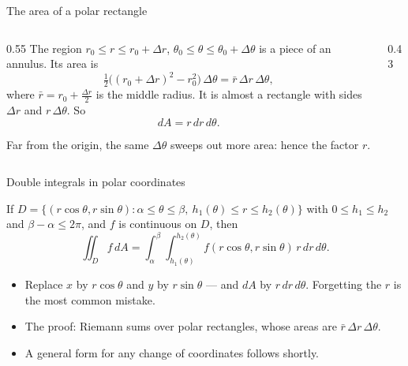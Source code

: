 \documentclass[10pt]{wosm-slides}
\newcommand{\dA}{\, dA}
\begin{document}
\begin{frame}{The area of a polar rectangle}
  \begin{columns}[c]
    \begin{column}{0.55\textwidth}
      The region $r_0 \le r \le r_0 + \Delta r$, $\theta_0 \le \theta \le \theta_0 + \Delta\theta$ is a piece of
      an annulus. Its area is
      \[ \tfrac12 \bigl((r_0 + \Delta r)^2 - r_0^2\bigr)\, \Delta\theta = \bar r\, \Delta r\, \Delta\theta , \]
      where $\bar r = r_0 + \frac{\Delta r}{2}$ is the middle radius.
      \pause
      It is almost a rectangle with sides $\Delta r$ and $r\,\Delta\theta$. So
      \[ dA = r\, dr\, d\theta . \]
      \pause
      {\small Far from the origin, the same $\Delta\theta$ sweeps out more area: hence the factor $r$.\par}
    \end{column}
    \begin{column}{0.43\textwidth}
      \centering
    \end{column}
  \end{columns}
\end{frame}

\begin{frame}{Double integrals in polar coordinates}
  \begin{theorem}
    If $D = \{(r\cos\theta, r\sin\theta) : \alpha \le \theta \le \beta, \ h_1(\theta) \le r \le h_2(\theta)\}$
    with $0 \le h_1 \le h_2$ and $\beta - \alpha \le 2\pi$, and $f$ is continuous on $D$, then
    \[ \iint_D f \dA = \int_\alpha^\beta \int_{h_1(\theta)}^{h_2(\theta)} f(r\cos\theta, r\sin\theta)\, r\, dr\, d\theta . \]
  \end{theorem}
  \pause
  \begin{itemize}
    \item Replace $x$ by $r\cos\theta$ and $y$ by $r\sin\theta$ --- and $dA$ by $r\, dr\, d\theta$. Forgetting
      the $r$ is the most common mistake.
    \item The proof: Riemann sums over polar rectangles, whose areas are $\bar r\, \Delta r\, \Delta\theta$.
    \item A general form for any change of coordinates follows shortly.
  \end{itemize}
\end{frame}
\end{document}
